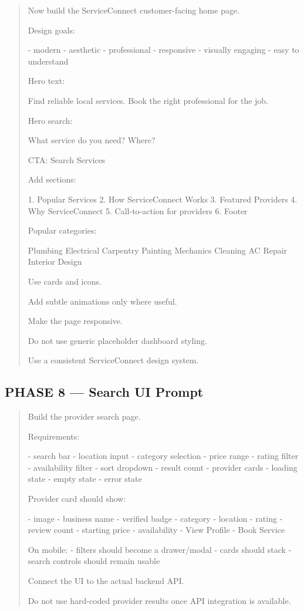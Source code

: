 \begin{quote}
Now build the ServiceConnect customer-facing home page.

Design goals:

- modern
- aesthetic
- professional
- responsive
- visually engaging
- easy to understand

Hero text:

Find reliable local services.
Book the right professional for the job.

Hero search:

What service do you need?
Where?

CTA:
Search Services

Add sections:

1. Popular Services
2. How ServiceConnect Works
3. Featured Providers
4. Why ServiceConnect
5. Call-to-action for providers
6. Footer

Popular categories:

Plumbing
Electrical
Carpentry
Painting
Mechanics
Cleaning
AC Repair
Interior Design

Use cards and icons.

Add subtle animations only where useful.

Make the page responsive.

Do not use generic placeholder dashboard styling.

Use a consistent ServiceConnect design system.
\end{quote}

\subsection*{PHASE 8 --- Search UI Prompt}

\begin{quote}
Build the provider search page.

Requirements:

- search bar
- location input
- category selection
- price range
- rating filter
- availability filter
- sort dropdown
- result count
- provider cards
- loading state
- empty state
- error state

Provider card should show:

- image
- business name
- verified badge
- category
- location
- rating
- review count
- starting price
- availability
- View Profile
- Book Service

On mobile:
- filters should become a drawer/modal
- cards should stack
- search controls should remain usable

Connect the UI to the actual backend API.

Do not use hard-coded provider results once API integration is available.
\end{quote}

